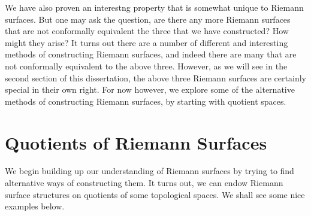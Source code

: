 \documentclass[11pt]{report}
\theoremstyle{definition}
\begin{document}
We have also proven an interestng property that is somewhat unique to Riemann surfaces. But one may ask the question, are there any more Riemann surfaces that are not conformally equivalent the three that we have constructed? How might they arise? It turns out there are a number of different and interesting methods of constructing Riemann surfaces, and indeed there are many that are not conformally equivalent to the above three. However, as we will see in the second section of this dissertation, the above three Riemann surfaces are certainly special in their own right. For now however, we explore some of the alternative methods of constructing Riemann surfaces, by starting with quotient spaces. 

\section{Quotients of Riemann Surfaces}\label{QuotientSection}
We begin building up our understanding of Riemann surfaces by trying to find alternative ways of constructing them. It turns out, we can endow Riemann surface structures on quotients of some topological spaces. We shall see some nice examples below.
\end{document}
